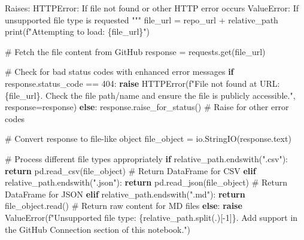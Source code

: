 \documentclass[
  11pt,
  letterpaper,
]{book}
\newenvironment{Shaded}{\begin{snugshade}}{\end{snugshade}}
\newcommand{\BuiltInTok}[1]{\textcolor[rgb]{0.00,0.23,0.31}{#1}}
\newcommand{\CommentTok}[1]{\textcolor[rgb]{0.37,0.37,0.37}{#1}}
\newcommand{\ControlFlowTok}[1]{\textcolor[rgb]{0.00,0.23,0.31}{\textbf{#1}}}
\newcommand{\DecValTok}[1]{\textcolor[rgb]{0.68,0.00,0.00}{#1}}
\newcommand{\NormalTok}[1]{\textcolor[rgb]{0.00,0.23,0.31}{#1}}
\newcommand{\OperatorTok}[1]{\textcolor[rgb]{0.37,0.37,0.37}{#1}}
\newcommand{\PreprocessorTok}[1]{\textcolor[rgb]{0.68,0.00,0.00}{#1}}
\newcommand{\SpecialCharTok}[1]{\textcolor[rgb]{0.37,0.37,0.37}{#1}}
\newcommand{\SpecialStringTok}[1]{\textcolor[rgb]{0.13,0.47,0.30}{#1}}
\newcommand{\StringTok}[1]{\textcolor[rgb]{0.13,0.47,0.30}{#1}}
\begin{document}
\begin{Shaded}
\begin{Highlighting}[]
\CommentTok{    Raises:}
\CommentTok{        HTTPError: If file not found or other HTTP error occurs}
\CommentTok{        ValueError: If unsupported file type is requested}
\CommentTok{    """}
\NormalTok{    file\_url }\OperatorTok{=}\NormalTok{ repo\_url }\OperatorTok{+}\NormalTok{ relative\_path}
    \BuiltInTok{print}\NormalTok{(}\SpecialStringTok{f"Attempting to load: }\SpecialCharTok{\{}\NormalTok{file\_url}\SpecialCharTok{\}}\SpecialStringTok{"}\NormalTok{)}

    \CommentTok{\# Fetch the file content from GitHub}
\NormalTok{    response }\OperatorTok{=}\NormalTok{ requests.get(file\_url)}

    \CommentTok{\# Check for bad status codes with enhanced error messages}
    \ControlFlowTok{if}\NormalTok{ response.status\_code }\OperatorTok{==} \DecValTok{404}\NormalTok{:}
        \ControlFlowTok{raise}\NormalTok{ HTTPError(}\SpecialStringTok{f"File not found at URL: }\SpecialCharTok{\{}\NormalTok{file\_url}\SpecialCharTok{\}}\SpecialStringTok{. Check the file path/name and ensure the file is publicly accessible."}\NormalTok{, response}\OperatorTok{=}\NormalTok{response)}
    \ControlFlowTok{else}\NormalTok{:}
\NormalTok{        response.raise\_for\_status()  }\CommentTok{\# Raise for other error codes}

    \CommentTok{\# Convert response to file{-}like object}
\NormalTok{    file\_object }\OperatorTok{=}\NormalTok{ io.StringIO(response.text)}

    \CommentTok{\# Process different file types appropriately}
    \ControlFlowTok{if}\NormalTok{ relative\_path.endswith(}\StringTok{".csv"}\NormalTok{):}
        \ControlFlowTok{return}\NormalTok{ pd.read\_csv(file\_object)  }\CommentTok{\# Return DataFrame for CSV}
    \ControlFlowTok{elif}\NormalTok{ relative\_path.endswith(}\StringTok{".json"}\NormalTok{):}
        \ControlFlowTok{return}\NormalTok{ pd.read\_json(file\_object)  }\CommentTok{\# Return DataFrame for JSON}
    \ControlFlowTok{elif}\NormalTok{ relative\_path.endswith(}\StringTok{".md"}\NormalTok{):}
        \ControlFlowTok{return}\NormalTok{ file\_object.read()  }\CommentTok{\# Return raw content for MD files}
    \ControlFlowTok{else}\NormalTok{:}
        \ControlFlowTok{raise} \PreprocessorTok{ValueError}\NormalTok{(}\SpecialStringTok{f"Unsupported file type: }\SpecialCharTok{\{}\NormalTok{relative\_path}\SpecialCharTok{.}\NormalTok{split(}\StringTok{\textquotesingle{}.\textquotesingle{}}\NormalTok{)[}\OperatorTok{{-}}\DecValTok{1}\NormalTok{]}\SpecialCharTok{\}}\SpecialStringTok{. Add support in the GitHub Connection section of this notebook."}\NormalTok{)}


\end{Highlighting}
\end{Shaded}
\end{document}
